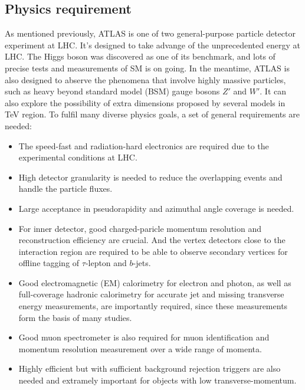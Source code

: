 \subsection{Physics requirement}

As mentioned previously, ATLAS is one of two general-purpose particle detector experiment at LHC.
It's designed to take advange of the unprecedented energy at LHC.
The Higgs boson was discovered as one of its benchmark, and lots of precise tests and measurements of SM is on going.
In the meantime, ATLAS is also designed to abserve the phenomena that involve highly massive particles, such as heavy beyond standard model (BSM) gauge bosons $Z'$ and $W'$.
It can also explore the possibility of extra dimensions proposed by several models in TeV region.
To fulfil many diverse physics goals, a set of general requirements are needed:
\begin{itemize}
	\item The speed-fast and radiation-hard electronics are required due to the experimental conditions at LHC. 
	\item High detector granularity is needed to reduce the overlapping events and handle the particle fluxes.
	\item Large acceptance in pseudorapidity and azimuthal angle coverage is needed.
	\item For inner detector, good charged-paricle momentum resolution and reconstruction efficiency are crucial. And the vertex detectors close to the interaction region are required to be able to observe secondary vertices for offline tagging of $\tau$-lepton and $b$-jets.
	\item Good electromagnetic (EM) calorimetry for electron and photon, as well as full-coverage hadronic calorimetry for accurate jet and missing transverse energy measurements, are importantly required, since these measurements form the basis of many studies.
	\item Good muon spectrometer is also required for muon identification and momentum resolution measurement over a wide range of momenta.
	\item Highly efficient but with sufficient background rejection triggers are also needed and extramely important for objects with low transverse-momentum. 
\end{itemize}
